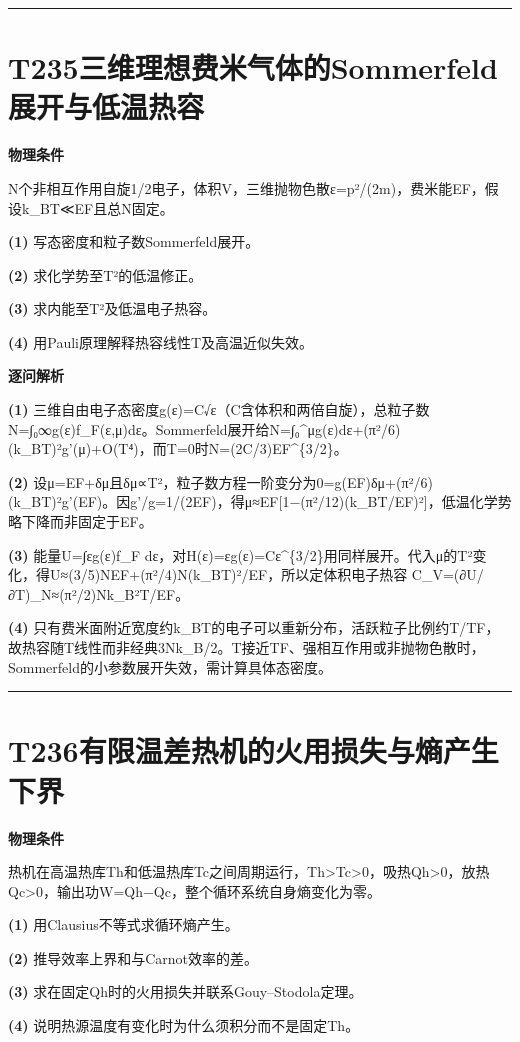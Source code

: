 \documentclass[UTF8,a4paper,11pt,oneside,openany]{ctexbook}
\begin{document}
\par\bigskip\hrule\bigskip
\section*{T235\quad 三维理想费米气体的Sommerfeld展开与低温热容}
\textbf{物理条件}\par N个非相互作用自旋1/2电子，体积V，三维抛物色散ε=p²/(2m)，费米能EF，假设k\_BT≪EF且总N固定。
\par\noindent\textbf{(1)} 写态密度和粒子数Sommerfeld展开。
\par\noindent\textbf{(2)} 求化学势至T²的低温修正。
\par\noindent\textbf{(3)} 求内能至T²及低温电子热容。
\par\noindent\textbf{(4)} 用Pauli原理解释热容线性T及高温近似失效。

\par\medskip\noindent\textbf{逐问解析}
\par\noindent\textbf{(1)} 三维自由电子态密度g(ε)=C√ε（C含体积和两倍自旋），总粒子数N=∫₀∞g(ε)f\_F(ε,μ)dε。Sommerfeld展开给N=∫₀\textasciicircum{}μg(ε)dε+(π²/6)(k\_BT)²g'(μ)+O(T⁴)，而T=0时N=(2C/3)EF\textasciicircum{}\{3/2\}。
\par\noindent\textbf{(2)} 设μ=EF+δμ且δμ∝T²，粒子数方程一阶变分为0=g(EF)δμ+(π²/6)(k\_BT)²g'(EF)。因g'/g=1/(2EF)，得μ≈EF[1−(π²/12)(k\_BT/EF)²]，低温化学势略下降而非固定于EF。
\par\noindent\textbf{(3)} 能量U=∫εg(ε)f\_F dε，对H(ε)=εg(ε)=Cε\textasciicircum{}\{3/2\}用同样展开。代入μ的T²变化，得U≈(3/5)NEF+(π²/4)N(k\_BT)²/EF，所以定体积电子热容 C\_V=(∂U/∂T)\_N≈(π²/2)Nk\_B²T/EF。
\par\noindent\textbf{(4)} 只有费米面附近宽度约k\_BT的电子可以重新分布，活跃粒子比例约T/TF，故热容随T线性而非经典3Nk\_B/2。T接近TF、强相互作用或非抛物色散时，Sommerfeld的小参数展开失效，需计算具体态密度。

\par\bigskip\hrule\bigskip
\section*{T236\quad 有限温差热机的火用损失与熵产生下界}
\textbf{物理条件}\par 热机在高温热库Th和低温热库Tc之间周期运行，Th>Tc>0，吸热Qh>0，放热Qc>0，输出功W=Qh−Qc，整个循环系统自身熵变化为零。
\par\noindent\textbf{(1)} 用Clausius不等式求循环熵产生。
\par\noindent\textbf{(2)} 推导效率上界和与Carnot效率的差。
\par\noindent\textbf{(3)} 求在固定Qh时的火用损失并联系Gouy–Stodola定理。
\par\noindent\textbf{(4)} 说明热源温度有变化时为什么须积分而不是固定Th。
\end{document}
